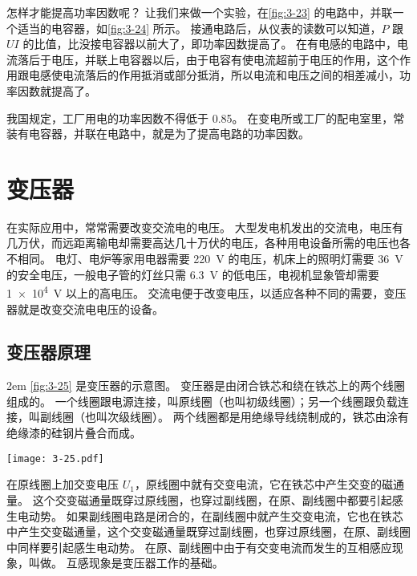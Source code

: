 怎样才能提高功率因数呢？
让我们来做一个实验，在\cref{fig:3-23} 的电路中，并联一个适当的电容器，如\cref{fig:3-24} 所示。
接通电路后，从仪表的读数可以知道，$P$ 跟 $UI$ 的比值，比没接电容器以前大了，即功率因数提高了。
在有电感的电路中，电流落后于电压，并联上电容器以后，由于电容有使电流超前于电压的作用，这个作用跟电感使电流落后的作用抵消或部分抵消，所以电流和电压之间的相差减小，功率因数就提高了。

我国规定，工厂用电的功率因数不得低于 0.85。
在变电所或工厂的配电室里，常装有电容器，并联在电路中，就是为了提高电路的功率因数。

\section{变压器}
在实际应用中，常常需要改变交流电的电压。
大型发电机发出的交流电，电压有几万伏，而远距离输电却需要高达几十万伏的电压，各种用电设备所需的电压也各不相同。
电灯、电炉等家用电器需要 \qty{220}{V} 的电压，机床上的照明灯需要 \qty{36}{V} 的安全电压，一般电子管的灯丝只需 \qty{6.3}{V} 的低电压，电视机显象管却需要\qty{1e4}{V} 以上的高电压。
交流电便于改变电压，以适应各种不同的需要，变压器就是改变交流电电压的设备。

\subsection{变压器原理}

\medskip\noindent
\begin{minipage}{0.5\linewidth}\parindent2em
\cref{fig:3-25} 是变压器的示意图。
变压器是由闭合铁芯和绕在铁芯上的两个线圈组成的。
一个线圈跟电源连接，叫原线圈（也叫初级线圈）；另一个线圈跟负载连接，叫副线圈（也叫次级线圈）。
两个线圈都是用绝缘导线绕制成的，铁芯由涂有绝缘漆的硅钢片叠合而成。
\end{minipage}\hfill
\begin{minipage}{0.45\linewidth}\centering
\begin{figurehere}
  \texttt{[image: 3-25.pdf]}
  \caption{}\label{fig:3-25}
\end{figurehere}
\end{minipage}

\medskip
在原线圈上加交变电压 $U_1$，原线圈中就有交变电流，它在铁芯中产生交变的磁通量。
这个交变磁通量既穿过原线圈，也穿过副线圈，在原、副线圈中都要引起感生电动势。
如果副线圈电路是闭合的，在副线圈中就产生交变电流，它也在铁芯中产生交变磁通量，这个交变磁通量既穿过副线圈，也穿过原线圈，在原、副线圈中同样要引起感生电动势。
在原、副线圈中由于有交变电流而发生的互相感应现象，叫做。
互感现象是变压器工作的基础。

